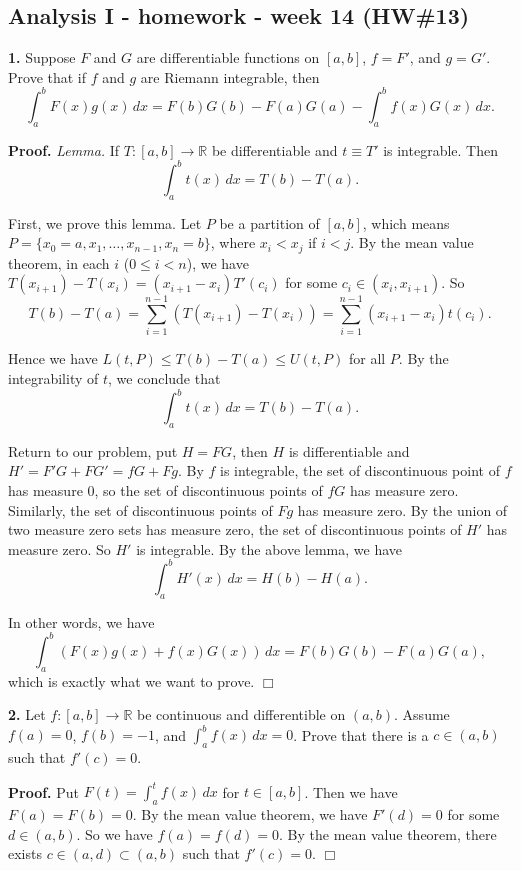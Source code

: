 \documentclass{article}
\begin{document}
    
    
    
    
    

    
    \subsection*{Analysis I - homework - week 14
(HW\#13)}\label{analysis-i---homework---week-14-hw13}

    \textbf{1.} Suppose $F$ and $G$ are differentiable functions on $[a,b]$,
$f=F'$, and $g=G'$. Prove that if $f$ and $g$ are Riemann integrable,
then
\[\int_a^b F(x)g(x) \,dx = F(b)G(b) - F(a)G(a) - \int_a^b f(x)G(x)\,dx.\]

    \textbf{Proof.} \emph{Lemma.} If $T:[a,b]\to \mathbb{R}$ be
differentiable and $t\equiv T'$ is integrable. Then
\[\int_a^b t(x) \,dx = T(b) - T(a).\]

First, we prove this lemma. Let $P$ be a partition of $[a,b]$, which
means $P = \{x_0=a,x_1,\ldots,x_{n-1},x_n=b\}$, where $x_i < x_j$ if
$i < j$. By the mean value theorem, in each $i$ ($0\le i < n$), we have
$T(x_{i+1})-T(x_i) = (x_{i+1}-x_i)T'(c_i)$ for some
$c_i \in (x_i,x_{i+1})$. So
\[T(b) - T(a) = \sum_{i=1}^{n-1}(T(x_{i+1})-T(x_i) ) = \sum_{i=1}^{n-1} (x_{i+1}-x_i)t(c_i).\]

Hence we have $L(t,P) \le T(b) -T(a) \le U(t,P)$ for all $P$. By the
integrability of $t$, we conclude that
\[\int_a^b t(x) \,dx = T(b) - T(a).\]

Return to our problem, put $H=FG$, then $H$ is differentiable and
$H'=F'G+FG' = fG + Fg$. By $f$ is integrable, the set of discontinuous
point of $f$ has measure $0$, so the set of discontinuous points of $fG$
has measure zero. Similarly, the set of discontinuous points of $Fg$ has
measure zero. By the union of two measure zero sets has measure zero,
the set of discontinuous points of $H'$ has measure zero. So $H'$ is
integrable. By the above lemma, we have
\[\int_a^bH'(x)\,dx = H(b) - H(a).\]

In other words, we have
\[\int_a^b (F(x)g(x) + f(x)G(x))\,dx = F(b)G(b) - F(a)G(a),\] which is
exactly what we want to prove. $\Box$

    \textbf{2.} Let $f:[a,b]\to \mathbb{R}$ be continuous and differentible
on $(a,b)$. Assume $f(a) = 0$, $f(b) = -1$, and $\int_a^bf(x)\,dx = 0$.
Prove that there is a $c\in (a,b)$ such that $f'(c) = 0$.

    \textbf{Proof.} Put $F(t) = \int_a^t f(x)\,dx$ for $t\in [a,b]$. Then we
have $F(a) = F(b) = 0$. By the mean value theorem, we have $F'(d) = 0$
for some $d\in (a,b)$. So we have $f(a) = f(d) = 0$. By the mean value
theorem, there exists $c\in (a,d)\subset (a,b)$ such that $f'(c) = 0$.
$\Box$
\end{document}
